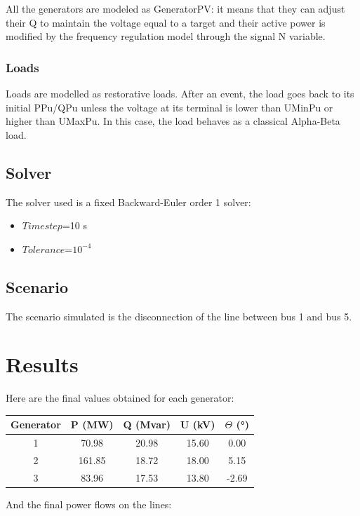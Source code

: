 \documentclass[a4paper, 12pt]{report}
\begin{document}
All the generators are modeled as GeneratorPV: it means that they can adjust their Q to maintain the voltage equal to a target and their active power is modified by the frequency regulation model through the signal N variable.

\subsubsection{Loads}

Loads are modelled as restorative loads. After an event, the load goes back to its initial PPu/QPu unless the voltage at its terminal is lower than UMinPu or higher than UMaxPu. In this case, the load behaves as a classical Alpha-Beta load.

\subsection{Solver}
The solver used is a fixed Backward-Euler order 1 solver:
\begin{itemize}
\item $Time step$=10 s
\item $Tolerance$=$10^{-4}$
\end{itemize}

\subsection{Scenario}
The scenario simulated is the disconnection of the line between bus 1 and bus 5.

\newpage
\section{Results}

Here are the final values obtained for each generator:

\begin{center}
\begin{tabular}{|c|c|c|c|c|}
  \hline
  Generator & P (MW) & Q (Mvar) & U (kV) & $\Theta$ (°) \\
  \hline
  1 & 70.98 & 20.98 & 15.60 & 0.00\\
  2 & 161.85 & 18.72 & 18.00 & 5.15\\
  3 & 83.96 & 17.53 & 13.80 & -2.69\\
  \hline
\end{tabular}
\end{center}

And the final power flows on the lines:
\end{document}
